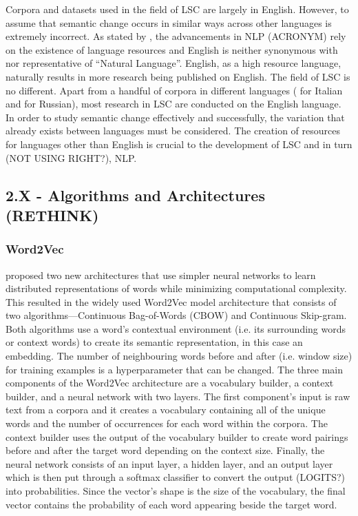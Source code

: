 Corpora and datasets used in the field of LSC are largely in English. However, to assume that semantic change occurs in similar ways across other languages is extremely incorrect. As stated by \citet{bender_2020}, the advancements in NLP (ACRONYM) rely on the existence of language resources and English is neither synonymous with nor representative of “Natural Language”. English, as a high resource language, naturally results in more research being published on English. The field of LSC is no different. Apart from a handful of corpora in different languages (\citet{diacrita_evalita2020} for Italian and \citet{rushifteval2021} for Russian), most research in LSC are conducted on the English language. In order to study semantic change effectively and successfully, the variation that already exists between languages must be considered. The creation of resources for languages other than English is crucial to the development of LSC and in turn (NOT USING RIGHT?), NLP.   

\subsection{2.X - Algorithms and Architectures (RETHINK)}
\subsubsection{Word2Vec}

\citet{mikolov2013efficient} proposed two new architectures that use simpler neural networks to learn distributed representations of words while minimizing computational complexity. This resulted in the widely used Word2Vec model architecture that consists of two algorithms—Continuous Bag-of-Words (CBOW) and Continuous Skip-gram. Both algorithms use a word’s contextual environment (i.e. its surrounding words or context words) to create its semantic representation, in this case an embedding. The number of neighbouring words before and after (i.e. window size) for training examples is a hyperparameter that can be changed. The three main components of the Word2Vec architecture are a vocabulary builder, a context builder, and a neural network with two layers. The first component’s input is raw text from a corpora and it creates a vocabulary containing all of the unique words and the number of occurrences for each word within the corpora. The context builder uses the output of the vocabulary builder to create word pairings before and after the target word depending on the context size. Finally, the neural network consists of an input layer, a hidden layer, and an output layer which is then put through a softmax classifier to convert the output (LOGITS?) into probabilities. Since the vector’s shape is the size of the vocabulary, the final vector contains the probability of each word appearing beside the target word. 

